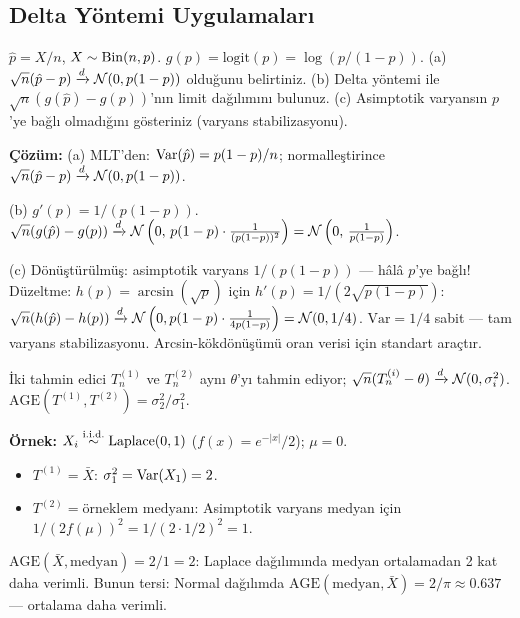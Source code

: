 \subsection{Delta Yöntemi Uygulamaları}

\begin{ornek}
$\hat p=X/n$, $X\sim\operatorname{Bin}(n,p)$. $g(p)=\mathrm{logit}(p)=\log(p/(1-p))$.
(a) $\sqrt{n}(\hat p-p)\xrightarrow{d}\mathcal{N}(0,p(1-p))$ olduğunu belirtiniz.
(b) Delta yöntemi ile $\sqrt{n}(g(\hat p)-g(p))$'nın limit dağılımını bulunuz.
(c) Asimptotik varyansın $p$'ye bağlı olmadığını gösteriniz (varyans stabilizasyonu).

\textbf{Çözüm:}
(a) MLT'den: $\operatorname{Var}(\hat p)=p(1-p)/n$; normalleştirince $\sqrt{n}(\hat p-p)\xrightarrow{d}\mathcal{N}(0,p(1-p))$.

(b) $g'(p)=1/(p(1-p))$.
$\sqrt{n}(g(\hat p)-g(p))\xrightarrow{d}\mathcal{N}\left(0,\,p(1-p)\cdot\frac{1}{(p(1-p))^2}\right)=\mathcal{N}\left(0,\,\frac{1}{p(1-p)}\right)$.

(c) Dönüştürülmüş: asimptotik varyans $1/(p(1-p))$ --- hâlâ $p$'ye bağlı!
Düzeltme: $h(p)=\arcsin(\sqrt{p})$ için $h'(p)=1/(2\sqrt{p(1-p)})$:
$\sqrt{n}(h(\hat p)-h(p))\xrightarrow{d}\mathcal{N}\left(0,p(1-p)\cdot\frac{1}{4p(1-p)}\right)=\mathcal{N}(0,1/4)$.
$\mathrm{Var}=1/4$ sabit --- tam varyans stabilizasyonu. Arcsin-kökdönüşümü oran verisi için standart araçtır.
\end{ornek}

\begin{ornek}
İki tahmin edici $T_n^{(1)}$ ve $T_n^{(2)}$ aynı $\theta$'yı tahmin ediyor; $\sqrt{n}(T_n^{(i)}-\theta)\xrightarrow{d}\mathcal{N}(0,\sigma_i^2)$.
$\mathrm{AGE}(T^{(1)},T^{(2)})=\sigma_2^2/\sigma_1^2$.

\textbf{Örnek:} $X_i\overset{\text{i.i.d.}}{\sim}\mathrm{Laplace}(0,1)$ ($f(x)=e^{-|x|}/2$); $\mu=0$.
\begin{itemize}
  \item $T^{(1)}=\bar X$: $\sigma^2_1=\operatorname{Var}(X_1)=2$.
  \item $T^{(2)}=\text{örneklem medyanı}$: Asimptotik varyans medyan için $1/(2f(\mu))^2=1/(2\cdot1/2)^2=1$.
\end{itemize}
$\mathrm{AGE}(\bar X,\text{medyan})=2/1=2$: Laplace dağılımında medyan ortalamadan 2 kat daha verimli.
Bunun tersi: Normal dağılımda $\mathrm{AGE}(\text{medyan},\bar X)=2/\pi\approx0.637$ --- ortalama daha verimli.
\end{ornek}

